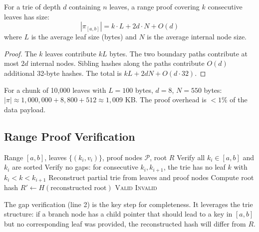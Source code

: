 \begin{proposition}
For a trie of depth $d$ containing $n$ leaves, a range proof covering $k$ consecutive leaves has size:
\begin{equation}
    |\pi_{[a,b]}| = k \cdot L + 2d \cdot N + O(d)
\end{equation}
where $L$ is the average leaf size (bytes) and $N$ is the average internal node size.
\end{proposition}

\begin{proof}
The $k$ leaves contribute $kL$ bytes. The two boundary paths contribute at most $2d$ internal nodes. Sibling hashes along the paths contribute $O(d)$ additional 32-byte hashes. The total is $kL + 2dN + O(d \cdot 32)$.
\end{proof}

For a chunk of 10,000 leaves with $L = 100$ bytes, $d = 8$, $N = 550$ bytes: $|\pi| \approx 1{,}000{,}000 + 8{,}800 + 512 \approx 1{,}009$ KB. The proof overhead is $< 1\%$ of the data payload.

\subsection{Range Proof Verification}

\begin{algorithm}[H]
\caption{Merkle Range Proof Verification}
\label{alg:verify_range}
\begin{algorithmic}[1]
\Require Range $[a, b]$, leaves $\{(k_i, v_i)\}$, proof nodes $\mathcal{P}$, root $R$
\State Verify all $k_i \in [a, b]$ and $k_i$ are sorted
\State Verify no gaps: for consecutive $k_i, k_{i+1}$, the trie has no leaf $k$ with $k_i < k < k_{i+1}$
\State Reconstruct partial trie from leaves and proof nodes
\State Compute root hash $R' \gets H(\text{reconstructed root})$
    \State \Return \textsc{Valid}
\Else
    \State \Return \textsc{Invalid}
\EndIf
\end{algorithmic}
\end{algorithm}

The gap verification (line 2) is the key step for completeness. It leverages the trie structure: if a branch node has a child pointer that should lead to a key in $[a,b]$ but no corresponding leaf was provided, the reconstructed hash will differ from $R$.

